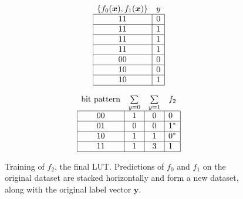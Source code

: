 \begin{figure}[!htb]
\begin{minipage}{.95\linewidth}\centering
  \begin{minipage}[b]{.30\linewidth}\centering
    \begin{align*}
      \begin{array}{cc}
        \{f_0(\bm{x}),f_1(\bm{x})\}          & y          \\ \hline
        \multicolumn{1}{|c|}{11} & \multicolumn{1}{c|}{0} \\ \hline
        \multicolumn{1}{|c|}{11} & \multicolumn{1}{c|}{1} \\ \hline
        \multicolumn{1}{|c|}{11} & \multicolumn{1}{c|}{1} \\ \hline
        \multicolumn{1}{|c|}{11} & \multicolumn{1}{c|}{1} \\ \hline
        \multicolumn{1}{|c|}{00} & \multicolumn{1}{c|}{0} \\ \hline
        \multicolumn{1}{|c|}{10} & \multicolumn{1}{c|}{0} \\ \hline
        \multicolumn{1}{|c|}{10} & \multicolumn{1}{c|}{1} \\ \hline
      \end{array}
    \end{align*}
  \end{minipage}
  \begin{minipage}[b]{.4\linewidth}\centering
    \begin{align*}
      \begin{array}{cccc}
          \text{bit pattern}        & \sum\limits_{y=0}      & \multicolumn{1}{l}{\sum\limits_{y=1}} & f_2  \\ \hline
        \multicolumn{1}{|c|}{00} & \multicolumn{1}{c|}{1} & \multicolumn{1}{c|}{0} & \multicolumn{1}{l|}{0} \\ \hline
        \multicolumn{1}{|c|}{01} & \multicolumn{1}{c|}{0} & \multicolumn{1}{c|}{0} & \multicolumn{1}{l|}{1^*} \\ \hline
        \multicolumn{1}{|c|}{10} & \multicolumn{1}{c|}{1} & \multicolumn{1}{c|}{1} & \multicolumn{1}{l|}{0^*} \\ \hline
        \multicolumn{1}{|c|}{11} & \multicolumn{1}{c|}{1} & \multicolumn{1}{c|}{3} & \multicolumn{1}{l|}{1} \\ \hline
      \end{array}
    \end{align*}
  \end{minipage}
\end{minipage}
  \normalfont
  \caption{Training of $f_2$, the final LUT. Predictions of $f_0$ and $f_1$ on the original dataset are stacked horizontally and form a new dataset, along with the original label vector $\bm{y}$.}
    \label{fig:ex2}
\end{figure}
\FloatBarrier

